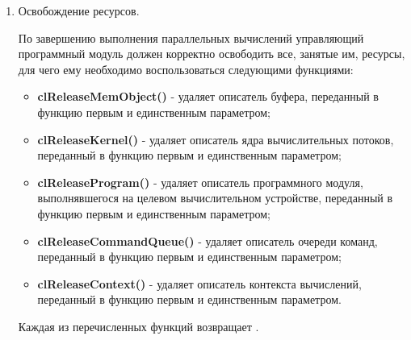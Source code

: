 \begin{enumerate}

		\item Освобождение ресурсов.

			По завершению выполнения параллельных вычислений управляющий программный модуль должен корректно освободить все, занятые им, ресурсы, для чего ему необходимо воспользоваться следующими функциями:

			\newcommand{\openclrelease}[2]{\item {\bf clRelease#1()} - удаляет описатель #2, переданный в функцию первым и единственным параметром}

			\begin{itemize}

				\openclrelease{MemObject}{буфера};
				\openclrelease{Kernel}{ядра вычислительных потоков};
				\openclrelease{Program}{программного модуля, выполнявшегося на целевом вычислительном устройстве};
				\openclrelease{CommandQueue}{очереди команд};
				\openclrelease{Context}{контекста вычислений}.

			\end{itemize}

			Каждая из перечисленных функций возвращает \openclsuccess.


\end{enumerate}

